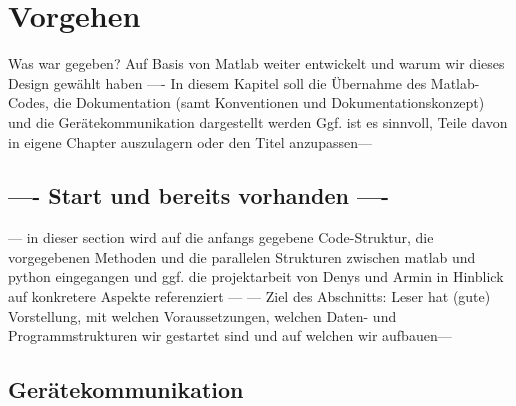 \documentclass[../Report.tex]{subfiles}
\begin{document}
\chapter{Vorgehen}
\label{chap:vorgehen}
Was war gegeben? Auf Basis von Matlab weiter entwickelt und warum wir dieses Design gewählt haben
---- In diesem Kapitel soll die Übernahme des Matlab-Codes, die Dokumentation (samt Konventionen und Dokumentationskonzept) und die Gerätekommunikation dargestellt werden 
Ggf. ist es sinnvoll, Teile davon in eigene Chapter auszulagern oder den Titel anzupassen--- 

\section[---setup ---]{---- Start und bereits vorhanden  ----}
\label{sec:vorg.setup}
--- in dieser section wird auf die anfangs gegebene Code-Struktur, die vorgegebenen Methoden und die parallelen Strukturen zwischen matlab und python eingegangen und ggf. die projektarbeit von Denys und Armin in Hinblick auf konkretere Aspekte referenziert ---
--- Ziel des Abschnitts: Leser hat (gute) Vorstellung, mit welchen Voraussetzungen, welchen Daten- und Programmstrukturen wir gestartet sind und auf welchen wir aufbauen---


\section{Gerätekommunikation}
\label{sec:vorg.geraete}
\end{document}
